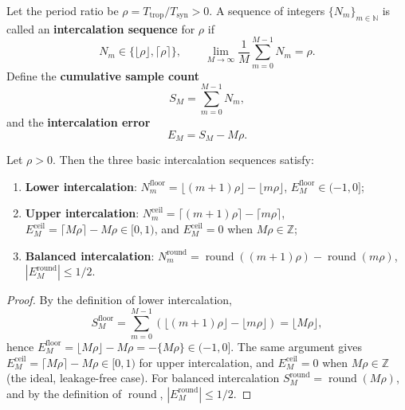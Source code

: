\begin{definition}\label{def:calendar_intercalation}
Let the period ratio be \(\rho=T_{\text{trop}}/T_{\text{syn}}>0\). A sequence of integers \(\{N_m\}_{m\in\mathbb N}\) is called an \textbf{intercalation sequence} for \(\rho\) if
\[
N_m\in\{\lfloor\rho\rfloor,\lceil\rho\rceil\},\qquad
\lim_{M\to\infty}\frac1M\sum_{m=0}^{M-1}N_m=\rho.
\]
Define the \textbf{cumulative sample count}
\[
S_M=\sum_{m=0}^{M-1}N_m,
\]
and the \textbf{intercalation error}
\[
E_M=S_M-M\rho.
\]
\end{definition}

\begin{theorem}\label{thm:calendar_intercalation_error_bound}
Let \(\rho>0\). Then the three basic intercalation sequences satisfy:
\begin{enumerate}[label=(\roman*)]
    \item \textbf{Lower intercalation}: \(N_m^{\mathrm{floor}}=\lfloor (m+1)\rho\rfloor-\lfloor m\rho\rfloor\), \(E_M^{\mathrm{floor}}\in(-1,0]\);
    \item \textbf{Upper intercalation}: \(N_m^{\mathrm{ceil}}=\lceil (m+1)\rho\rceil-\lceil m\rho\rceil\), \(E_M^{\mathrm{ceil}}=\lceil M\rho\rceil-M\rho\in[0,1)\), and \(E_M^{\mathrm{ceil}}=0\) when \(M\rho\in\mathbb Z\);
    \item \textbf{Balanced intercalation}: \(N_m^{\mathrm{round}}=\operatorname{round}((m+1)\rho)-\operatorname{round}(m\rho)\), \(|E_M^{\mathrm{round}}|\le 1/2\).
\end{enumerate}
\end{theorem}

\begin{proof}
By the definition of lower intercalation,
\[
S_M^{\mathrm{floor}}=\sum_{m=0}^{M-1}(\lfloor (m+1)\rho\rfloor-\lfloor m\rho\rfloor)=\lfloor M\rho\rfloor,
\]
hence \(E_M^{\mathrm{floor}}=\lfloor M\rho\rfloor-M\rho=-\{M\rho\}\in(-1,0]\). The same argument gives \(E_M^{\mathrm{ceil}}=\lceil M\rho\rceil-M\rho\in[0,1)\) for upper intercalation, and \(E_M^{\mathrm{ceil}}=0\) when \(M\rho\in\mathbb Z\) (the ideal, leakage-free case). For balanced intercalation \(S_M^{\mathrm{round}}=\operatorname{round}(M\rho)\), and by the definition of \(\operatorname{round}\), \(|E_M^{\mathrm{round}}|\le 1/2\).
\end{proof}

